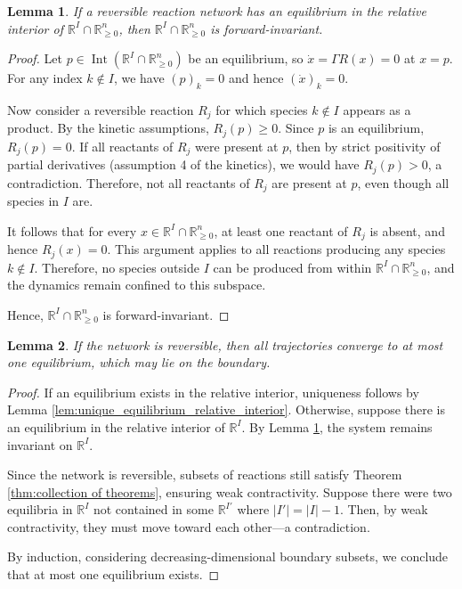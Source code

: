 \documentclass{article}
\newtheorem{lem}{Lemma}
\begin{document}
\begin{lem}
\label{lem:reversible_boundary_invariant}
If a reversible reaction network has an equilibrium in the relative interior of \( \mathbb{R}^I \cap \mathbb{R}_{\geq 0}^n \), then \( \mathbb{R}^I \cap \mathbb{R}_{\geq 0}^n \) is forward-invariant.
\end{lem}

\begin{proof}
Let \( p \in \operatorname{Int}(\mathbb{R}^I \cap \mathbb{R}_{\geq 0}^n) \) be an equilibrium, so \( \dot{x} = \Gamma R(x) = 0 \) at \( x = p \). For any index \( k \notin I \), we have \( (p)_k = 0 \) and hence \( (\dot{x})_k = 0 \).

Now consider a reversible reaction \( R_j \) for which species \( k \notin I \) appears as a product. By the kinetic assumptions, \( R_j(p) \geq 0 \). Since \( p \) is an equilibrium, \( R_j(p) = 0 \). If all reactants of \( R_j \) were present at \( p \), then by strict positivity of partial derivatives (assumption 4 of the kinetics), we would have \( R_j(p) > 0 \), a contradiction. Therefore, not all reactants of \( R_j \) are present at \( p \), even though all species in \( I \) are.

It follows that for every \( x \in \mathbb{R}^I \cap \mathbb{R}_{\geq 0}^n \), at least one reactant of \( R_j \) is absent, and hence \( R_j(x) = 0 \). This argument applies to all reactions producing any species \( k \notin I \). Therefore, no species outside \( I \) can be produced from within \( \mathbb{R}^I \cap \mathbb{R}_{\geq 0}^n \), and the dynamics remain confined to this subspace.

Hence, \( \mathbb{R}^I \cap \mathbb{R}_{\geq 0}^n \) is forward-invariant.
\end{proof}


\begin{lem}
\label{lem:reversible_unique_equilibrium}
If the network is reversible, then all trajectories converge to at most one equilibrium, which may lie on the boundary.
\end{lem}

\begin{proof}
If an equilibrium exists in the relative interior, uniqueness follows by Lemma \ref{lem:unique_equilibrium_relative_interior}. Otherwise, suppose there is an equilibrium in the relative interior of \( \mathbb{R}^I \). By Lemma \ref{lem:reversible_boundary_invariant}, the system remains invariant on \( \mathbb{R}^I \).

Since the network is reversible, subsets of reactions still satisfy Theorem \ref{thm:collection of theorems}, ensuring weak contractivity. Suppose there were two equilibria in \( \mathbb{R}^I \) not contained in some \( \mathbb{R}^{I'} \) where \( |I'| = |I| - 1 \). Then, by weak contractivity, they must move toward each other—a contradiction. 

By induction, considering decreasing-dimensional boundary subsets, we conclude that at most one equilibrium exists.
\end{proof}
\end{document}
